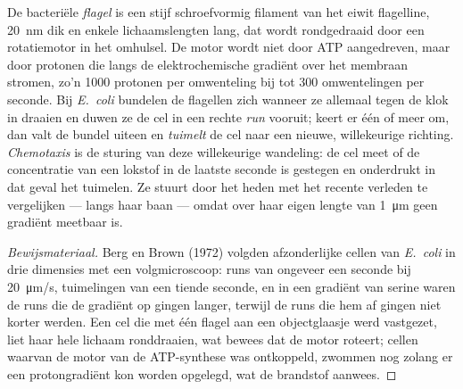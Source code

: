 \begin{proposition}\label{prop:b2:unicellular-diversity:flagellum}
De bacteriële \emph{flagel} is een stijf schroefvormig filament van het
eiwit flagelline, \qty{20}{nm} dik en enkele lichaamslengten lang, dat
wordt rondgedraaid door een rotatiemotor in het omhulsel. De motor
wordt niet door ATP aangedreven, maar door protonen die langs de
elektrochemische gradiënt over het membraan stromen, zo'n \num{1000}
protonen per omwenteling bij tot \num{300} omwentelingen per seconde.
Bij \emph{E.~coli} bundelen de flagellen zich wanneer ze allemaal
tegen de klok in draaien en duwen ze de cel in een rechte \emph{run}
vooruit; keert er één of meer om, dan valt de bundel uiteen en
\emph{tuimelt} de cel naar een nieuwe, willekeurige richting.
\emph{Chemotaxis} is de sturing van deze willekeurige wandeling: de
cel meet of de concentratie van een lokstof in de laatste seconde is
gestegen en onderdrukt in dat geval het tuimelen. Ze stuurt door het
heden met het recente verleden te vergelijken --- langs haar baan ---
omdat over haar eigen lengte van \qty{1}{\micro m} geen gradiënt
meetbaar is.
\end{proposition}
\begin{proof}[Bewijsmateriaal]
Berg en Brown (1972) volgden afzonderlijke cellen van \emph{E.~coli} in
drie dimensies met een volgmicroscoop: runs van ongeveer een seconde
bij \qty{20}{\micro m/s}, tuimelingen van een tiende seconde, en in
een gradiënt van serine waren de runs die de gradiënt op gingen
langer, terwijl de runs die hem af gingen niet korter werden. Een cel
die met één flagel aan een objectglaasje werd vastgezet, liet haar
hele lichaam ronddraaien, wat bewees dat de motor roteert; cellen
waarvan de motor van de ATP-synthese was ontkoppeld, zwommen nog zolang
er een protongradiënt kon worden opgelegd, wat de brandstof aanwees.
\end{proof}

